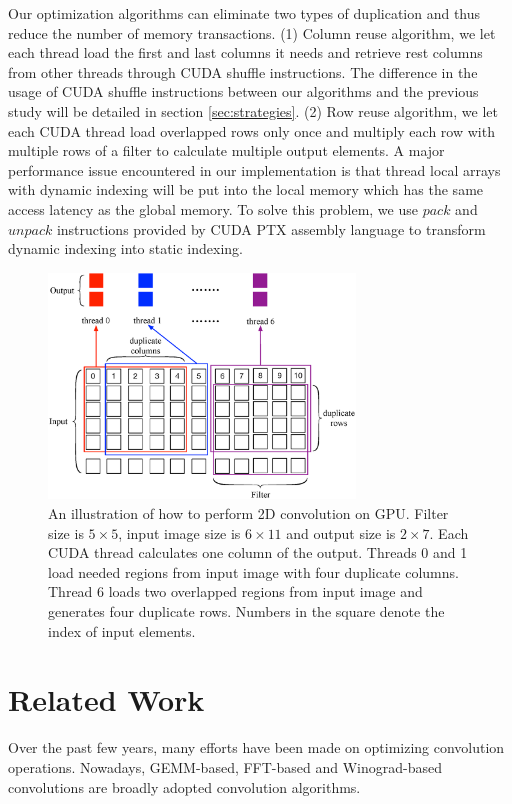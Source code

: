 \documentclass[sigplan,review,anonymous]{acmart}\settopmatter{printfolios=true,printccs=false,printacmref=false}
\begin{document}
Our optimization algorithms can eliminate two types of duplication and thus reduce the number of memory transactions. (1) Column reuse algorithm, we let each thread load the first and last columns it needs and retrieve rest columns from other threads through CUDA shuffle instructions. The difference in the usage of CUDA shuffle instructions between our algorithms and the previous study \cite{vasilache2014fast} will be detailed in section \ref{sec:strategies}. (2) Row reuse algorithm, we let each CUDA thread load overlapped rows only once and multiply each row with multiple rows of a filter to calculate multiple output elements. A major performance issue encountered in our implementation is that thread local arrays with dynamic indexing will be put into the local memory which has the same access latency as the global memory. To solve this problem, we use $pack$ and $unpack$ instructions provided by CUDA PTX assembly language to transform dynamic indexing into static indexing. 

\begin{figure}
\centering
  \includegraphics[width=\columnwidth,height=6cm]{./figure/twostrategies.eps}
  \caption{An illustration of how to perform 2D convolution on GPU. Filter size is $5 \times 5$, input image size is $6 \times 11$ and output size is $2 \times 7$. Each CUDA thread calculates one column of the output. Threads 0 and 1 load needed regions from input image with four duplicate columns. Thread 6 loads two overlapped regions from input image and generates four duplicate rows. Numbers in the square denote the index of input elements.}
  \label{fig:twostrategies}
\end{figure}


\section{Related Work}
Over the past few years, many efforts have been made on optimizing convolution operations. Nowadays, GEMM-based, FFT-based and Winograd-based convolutions are broadly adopted convolution algorithms.
\end{document}
